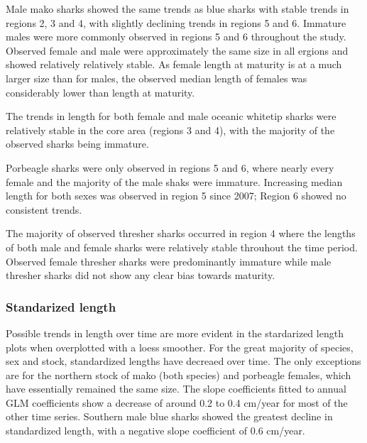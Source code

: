 \documentclass[12pt]{SCreport}
\begin{document}
Male mako sharks showed the same trends as blue sharks with stable trends in regions 2, 3 and 4, with slightly declining trends in regions 5 and 6. Immature males were more commonly observed in regions 5 and 6 throughout the study.  Observed female and male were approximately the same size in all ergions and showed relatively relatively stable.  As female length at maturity is at a much larger size than for males, the observed median length of females was considerably lower than  length at maturity.

The trends in length for both female and male oceanic whitetip sharks were relatively stable in the core area (regions 3 and 4),  with the majority of the observed sharks being immature.  

Porbeagle sharks were only observed in regions 5 and 6, where nearly every female and the majority of the male shaks were immature.  Increasing median length for both sexes was observed in region 5 since 2007; Region 6 showed no consistent trends.

The majority of observed thresher sharks occurred in region 4 where the lengths of both male and female sharks were relatively stable throuhout the time period. Observed female thresher sharks were predominantly immature while male thresher sharks did not show any clear bias towards maturity.

\subsubsection{Standarized length}
Possible trends in length over time are more evident in the stardarized length plots when overplotted with a loess smoother.  For the great majority of species, sex and stock, standardized lengths have decreaed over time.  The only exceptions are for the northern stock of mako (both species) and porbeagle females, which have essentially remained the same size.  The slope coefficients fitted to annual GLM coefficients show a decrease of around 0.2 to 0.4 cm/year for most of the other time series.  Southern male blue sharks showed the greatest decline in standardized length, with a negative slope coefficient of 0.6 cm/year.

      
\end{document}
